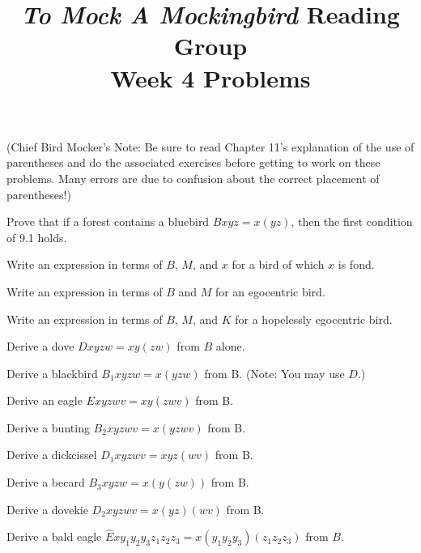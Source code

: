 \documentclass[12pt, letterpaper]{article}
\title{\emph{To Mock A Mockingbird} Reading Group\\Week 4 Problems}
\begin{document}
\maketitle

\disclaimer

\noindent (Chief Bird Mocker's Note: Be sure to read Chapter 11's explanation of the use of parentheses and do the associated exercises before getting to work on these problems. Many errors are due to confusion about the correct placement of parentheses!)

\begin{prob}{11.1}
Prove that if a forest contains a bluebird $Bxyz = x(yz)$, then the first condition of 9.1 holds.
\end{prob}

\begin{prob}{11.2}
Write an expression in terms of $B$, $M$, and $x$ for a bird of which $x$ is fond.
\end{prob}

\begin{prob}{11.3}
Write an expression in terms of $B$ and $M$ for an egocentric bird.
\end{prob}

\begin{prob}{11.4}
Write an expression in terms of $B$, $M$, and $K$ for a hopelessly egocentric bird.
\end{prob}

\begin{prob}{11.5}
Derive a dove $Dxyzw = xy(zw)$ from $B$ alone.
\end{prob}

\begin{prob}{11.6}
Derive a blackbird $B_1xyzw = x(yzw)$ from B. (Note: You may use $D$.)
\end{prob}

\begin{prob}{11.7}
Derive an eagle $Exyzwv = xy(zwv)$ from B.
\end{prob}

\begin{prob}{11.8}
Derive a bunting $B_2xyzwv = x(yzwv)$ from B.
\end{prob}

\begin{prob}{11.9}
Derive a dickcissel $D_1xyzwv = xyz(wv)$ from B.
\end{prob}

\begin{prob}{11.10}
Derive a becard $B_3xyzw = x(y(zw))$ from B.
\end{prob}

\begin{prob}{11.11}
Derive a dovekie $D_2xyzwv = x(yz)(wv)$ from B.
\end{prob}

\begin{prob}{11.12}
Derive a bald eagle $\hat{E}xy_1y_2y_3z_1z_2z_3 = x(y_1y_2y_3)(z_1z_2z_3)$ from  $B$.
\end{prob}
\end{document}
